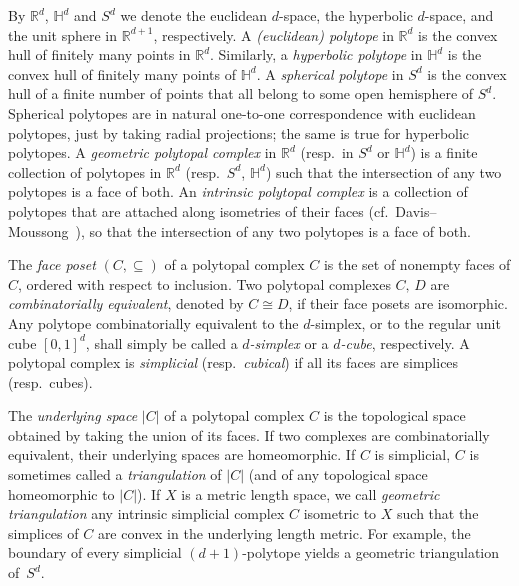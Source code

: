 \documentclass[a4paper,11pt]{article}
\theoremstyle{plain}
\theoremstyle{definition}
\newcommand{\R}{\mathbb{R}}
\begin{document}
By $\R^d$, $\mathbb{H}^d$ and $S^d$ we denote the euclidean $d$-space, the hyperbolic $d$-space, and the unit sphere in $\R^{d+1}$, respectively. A \emph{(euclidean) polytope} in $\R^d$ is the convex hull of finitely many points in $\R^d$. Similarly, a \emph{hyperbolic polytope} in $\mathbb{H}^d$ is the convex hull of finitely many points of $\mathbb{H}^d$. A \emph{spherical polytope} in $S^d$ is the convex hull of a finite number of points that all belong to some open hemisphere of $S^d$. Spherical polytopes are in natural one-to-one correspondence with euclidean polytopes, just by taking radial projections; the same is true for hyperbolic polytopes. A \emph{geometric polytopal complex} in $\R^d$ (resp.\ in $S^d$ or $\mathbb{H}^d$) is a finite collection of polytopes in $\R^d$ (resp.~$S^d$, $\mathbb{H}^d$) such that the intersection of any two polytopes is a face of both. An \emph{intrinsic polytopal complex} is a collection of polytopes that are attached along isometries of their faces (cf.\ Davis--Moussong~\cite[Sec.\ 2]{DavisMoussong}), so that the intersection of any two polytopes is a face of both. 

The \emph{face poset} $(C, \subseteq)$ of a polytopal complex $C$ is the set of nonempty faces of $C$, ordered with respect to inclusion.  Two polytopal complexes $C,\, D$ are \emph{combinatorially equivalent}, denoted by $C\cong D$, if their face posets are isomorphic. Any polytope combinatorially equivalent to the $d$-simplex, or to the regular unit cube $[0,1]^d$, shall simply be called a \emph{$d$-simplex} or a \emph{$d$-cube}, respectively. A polytopal complex is \emph{simplicial}  (resp.~\emph{cubical}) if all its faces are simplices (resp.~cubes). 

The \emph{underlying space} $|C|$ of a polytopal complex $C$ is the topological space obtained by taking the union of its faces. If two complexes are combinatorially equivalent, their underlying spaces are homeomorphic. %
If $C$ is simplicial, $C$ is sometimes called a \emph{triangulation} of $|C|$ (and of any topological space homeomorphic to $|C|$). If $X$ is a metric length space, we call \emph{geometric triangulation} any intrinsic simplicial complex $C$ isometric to $X$ such that the simplices of $C$ are convex in the underlying length metric. 
For example, the boundary of every simplicial $(d+1)$-polytope yields a geometric triangulation of~$S^{d}$. 
\end{document}
